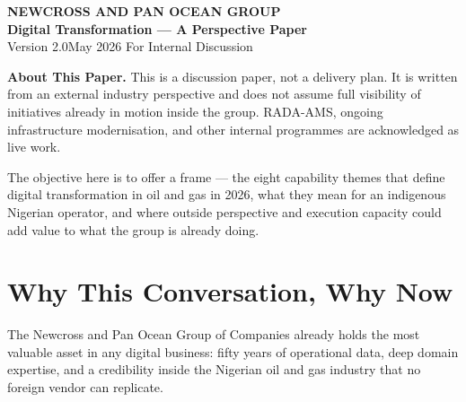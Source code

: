 \documentclass[10pt]{article}
\newcommand{\bigspacer}{\vspace{16pt}}
\begin{document}
\begin{center}
  \vspace*{0.1cm}
  {\color{primary}\LARGE\bfseries NEWCROSS AND PAN OCEAN GROUP}\\[6pt]
  {\color{primary}\large\bfseries Digital Transformation --- A Perspective Paper}\\[10pt]
  {\color{darkgrey}\normalsize Version 2.0\quad\textbar\quad May 2026\quad\textbar\quad
   For Internal Discussion}
\end{center}

\bigspacer

{\small
\renewcommand{\contentsname}{\color{primary}\normalsize\bfseries Contents}
\setcounter{tocdepth}{1}
\tableofcontents
}

\bigspacer

\noindent\colorbox{primary!8}{%
\begin{minipage}{\dimexpr\textwidth-2\fboxsep}
  \vspace{6pt}
  \textbf{\color{primary}About This Paper.}\quad
  This is a discussion paper, not a delivery plan. It is written from an external
  industry perspective and does not assume full visibility of initiatives already
  in motion inside the group. RADA-AMS, ongoing infrastructure modernisation, and
  other internal programmes are acknowledged as live work.

  \vspace{4pt}
  The objective here is to offer a frame --- the eight capability themes that
  define digital transformation in oil and gas in 2026, what they mean for an
  indigenous Nigerian operator, and where outside perspective and execution
  capacity could add value to what the group is already doing.
  \vspace{6pt}
\end{minipage}}

\bigspacer

\section{Why This Conversation, Why Now}

The Newcross and Pan Ocean Group of Companies already holds the most valuable
asset in any digital business: fifty years of operational data, deep domain
expertise, and a credibility inside the Nigerian oil and gas industry that no
foreign vendor can replicate.
\end{document}
